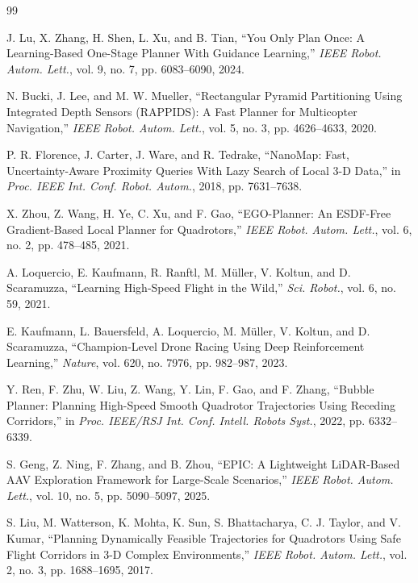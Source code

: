 \documentclass[letterpaper,10pt,conference]{ieeeconf}
\begin{document}
{\footnotesize
\begin{thebibliography}{99}

J. Lu, X. Zhang, H. Shen, L. Xu, and B. Tian,
``You Only Plan Once: A Learning-Based One-Stage Planner With Guidance
Learning,'' \emph{IEEE Robot. Autom. Lett.}, vol. 9, no. 7,
pp. 6083--6090, 2024.

N. Bucki, J. Lee, and M. W. Mueller,
``Rectangular Pyramid Partitioning Using Integrated Depth Sensors (RAPPIDS):
A Fast Planner for Multicopter Navigation,'' \emph{IEEE Robot. Autom. Lett.},
vol. 5, no. 3, pp. 4626--4633, 2020.

P. R. Florence, J. Carter, J. Ware, and R. Tedrake,
``NanoMap: Fast, Uncertainty-Aware Proximity Queries With Lazy Search of
Local 3-D Data,'' in \emph{Proc. IEEE Int. Conf. Robot. Autom.}, 2018,
pp. 7631--7638.

X. Zhou, Z. Wang, H. Ye, C. Xu, and F. Gao,
``EGO-Planner: An ESDF-Free Gradient-Based Local Planner for Quadrotors,''
\emph{IEEE Robot. Autom. Lett.}, vol. 6, no. 2, pp. 478--485, 2021.

A. Loquercio, E. Kaufmann, R. Ranftl, M. M\"uller, V. Koltun, and
D. Scaramuzza,
``Learning High-Speed Flight in the Wild,''
\emph{Sci. Robot.}, vol. 6, no. 59, 2021.

E. Kaufmann, L. Bauersfeld, A. Loquercio, M. M\"uller, V. Koltun, and
D. Scaramuzza,
``Champion-Level Drone Racing Using Deep Reinforcement Learning,''
\emph{Nature}, vol. 620, no. 7976, pp. 982--987, 2023.

Y. Ren, F. Zhu, W. Liu, Z. Wang, Y. Lin, F. Gao, and F. Zhang,
``Bubble Planner: Planning High-Speed Smooth Quadrotor Trajectories Using
Receding Corridors,'' in \emph{Proc. IEEE/RSJ Int. Conf. Intell. Robots
Syst.}, 2022, pp. 6332--6339.

S. Geng, Z. Ning, F. Zhang, and B. Zhou,
``EPIC: A Lightweight LiDAR-Based AAV Exploration Framework for Large-Scale
Scenarios,'' \emph{IEEE Robot. Autom. Lett.}, vol. 10, no. 5,
pp. 5090--5097, 2025.

S. Liu, M. Watterson, K. Mohta, K. Sun, S. Bhattacharya, C. J. Taylor, and
V. Kumar,
``Planning Dynamically Feasible Trajectories for Quadrotors Using Safe Flight
Corridors in 3-D Complex Environments,'' \emph{IEEE Robot. Autom. Lett.},
vol. 2, no. 3, pp. 1688--1695, 2017.


\end{thebibliography}}
\end{document}
